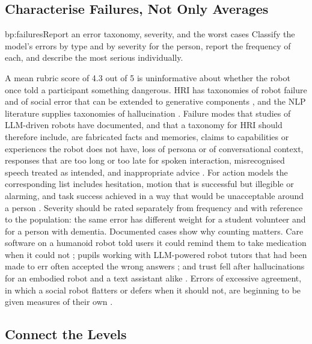 \subsection{Characterise Failures, Not Only Averages}

\begin{practice}{bp:failures}{Report an error taxonomy, severity, and the worst cases}
Classify the model's errors by type and by severity for the person, report the
frequency of each, and describe the most serious individually.
\end{practice}

A mean rubric score of 4.3 out of 5 is uninformative about whether the robot
once told a participant something dangerous. HRI has taxonomies of robot
failure and of social error that can be extended to generative components
\cite{honig2018understanding,tian2021taxonomy}, and the NLP literature
supplies taxonomies of hallucination \cite{ji2023survey}. Failure modes that
studies of LLM-driven robots have documented, and that a taxonomy for HRI
should therefore include, are fabricated facts and memories, claims to
capabilities or experiences the robot does not have, loss of persona or of
conversational context, responses that are too long or too late for spoken
interaction, misrecognised speech treated as intended, and inappropriate
advice \cite{irfan2025between,kim2024understanding,ranisch2025rapid,
ashok2026why}. For action models the
corresponding list includes hesitation, motion that is successful but
illegible or alarming, and task success achieved in a way that would be
unacceptable around a person \cite{guan2024task}. Severity should be rated
separately from frequency and with reference to the population: the same
error has different weight for a student volunteer and for a person with
dementia. Documented cases show why counting matters. Care software on a
humanoid robot told users it could remind them to take medication when it
could not \cite{ranisch2025rapid}; pupils working with LLM-powered robot
tutors that had been made to err often accepted the wrong answers
\cite{rutatola2026robot}; and trust fell after hallucinations for an
embodied robot and a text assistant alike \cite{sheng2026trust}. Errors of
excessive agreement, in which a social robot flatters or defers when it
should not, are beginning to be given measures of their own
\cite{seaborn2026robotic}.

\subsection{Connect the Levels}

